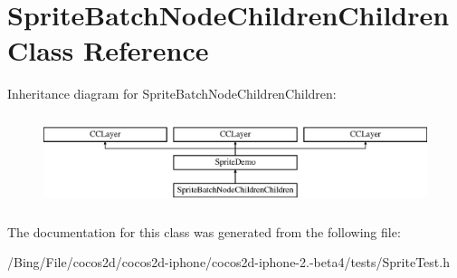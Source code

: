 \hypertarget{interface_sprite_batch_node_children_children}{\section{Sprite\-Batch\-Node\-Children\-Children Class Reference}
\label{interface_sprite_batch_node_children_children}
}
Inheritance diagram for Sprite\-Batch\-Node\-Children\-Children\-:\begin{figure}[H]
\begin{center}
\leavevmode
\includegraphics[height=2.654028cm]{interface_sprite_batch_node_children_children}
\end{center}
\end{figure}


The documentation for this class was generated from the following file\-:\begin{DoxyCompactItemize}
\item 
/\-Bing/\-File/cocos2d/cocos2d-\/iphone/cocos2d-\/iphone-\/2.-\/beta4/tests/Sprite\-Test.\-h\end{DoxyCompactItemize}

